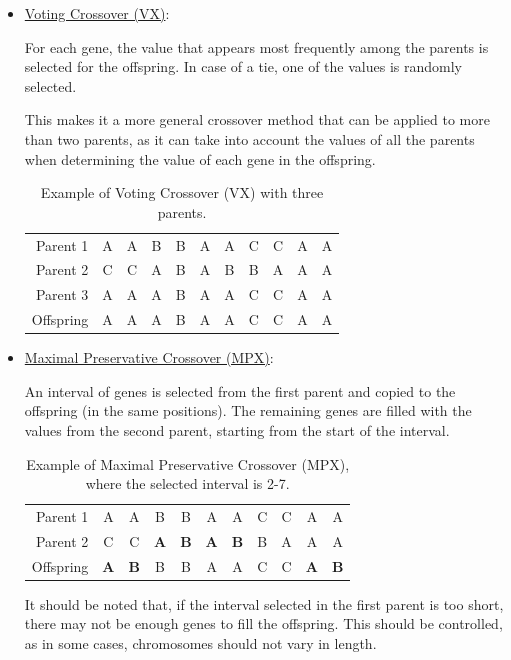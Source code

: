 \begin{itemize}
    \item \ul{Voting Crossover (VX)}:
    
    For each gene, the value that appears most frequently among the parents is selected for the offspring. In case of a tie, one of the values is randomly selected.

    This makes it a more general crossover method that can be applied to more than two parents, as it can take into account the values of all the parents when determining the value of each gene in the offspring.
    \begin{table}[ht]
        \centering
        \begin{tabular}{r|cccccccccc}
            Parent 1 & {A} & {A} & B & {B} & {A} & A & C & C & {A} & A \\
            Parent 2 & C & C & A & B & A & B & B & A & A & A \\
            Parent 3 & A & A & A & B & A & A & C & C & A & A \\ \hline
            Offspring & {A} & {A} & A & {B} & {A} & A & C & C & {A} & A
        \end{tabular}
        \caption{\centering Example of Voting Crossover (VX) with three parents.}
    \end{table}

    \item \ul{Maximal Preservative Crossover (MPX)}:
    
    An interval of genes is selected from the first parent and copied to the offspring (in the same positions). The remaining genes are filled with the values from the second parent, starting from the start of the interval.
    \begin{table}[ht]
        \centering
        \begin{tabular}{r|cc|cccccc|cc}
            Parent 1 & A & A & {B} & {B} & {A} & {A} & {C} & {C} & A & A \\
            Parent 2 & C & C & \textbf{A} & \textbf{B} & \textbf{A} & \textbf{B} & B & A & A & A \\ \hline
            Offspring & \textbf{A} & \textbf{B} & {B} & {B} & {A} & {A} & {C} & {C} & \textbf{A} & \textbf{B}
        \end{tabular}
        \caption{\centering Example of Maximal Preservative Crossover (MPX), where the selected interval is 2-7.}
    \end{table}

    It should be noted that, if the interval selected in the first parent is too short, there may not be enough genes to fill the offspring. This should be controlled, as in some cases, chromosomes should not vary in length.


\end{itemize}
